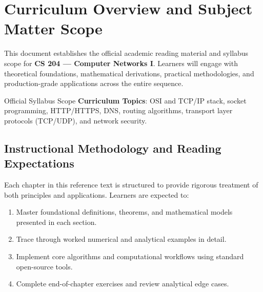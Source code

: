 \section{Curriculum Overview and Subject Matter Scope}

This document establishes the official academic reading material and syllabus scope for \textbf{CS 204 --- Computer Networks I}. Learners will engage with theoretical foundations, mathematical derivations, practical methodologies, and production-grade applications across the entire sequence.

\begin{InsightBox}{Official Syllabus Scope}
  \textbf{Curriculum Topics}: OSI and TCP/IP stack, socket programming, HTTP/HTTPS, DNS, routing algorithms, transport layer protocols (TCP/UDP), and network security.
\end{InsightBox}

\subsection{Instructional Methodology and Reading Expectations}

Each chapter in this reference text is structured to provide rigorous treatment of both principles and applications. Learners are expected to:
\begin{enumerate}
  \item Master foundational definitions, theorems, and mathematical models presented in each section.
  \item Trace through worked numerical and analytical examples in detail.
  \item Implement core algorithms and computational workflows using standard open-source tools.
  \item Complete end-of-chapter exercises and review analytical edge cases.
\end{enumerate}

